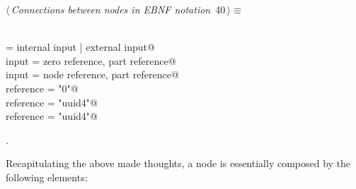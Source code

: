 \documentclass[
    a4paper,      %
    10pt,         %
    openright,    %
    notitlepage,  %
    parskip=half, %
]{scrreprt}       %
\theoremstyle{definition}                    %
\begin{document}
\begin{flushleft} \small
\begin{minipage}{\linewidth}\label{scrap48}\raggedright\small
{} $\langle\,${\itshape Connections between nodes in EBNF notation}\nobreak\ {\footnotesize {40}}$\,\rangle\equiv$
\vspace{-1ex}
\begin{list}{}{} \item
\mbox{}\lstinline@@\\
\mbox{}\lstinline@input = internal input | external input@\\
\mbox{}\lstinline@internal input = zero reference, part reference@\\
\mbox{}\lstinline@external input = node reference, part reference@\\
\mbox{}\lstinline@zero reference = "0"@\\
\mbox{}\lstinline@node reference = "uuid4"@\\
\mbox{}\lstinline@part reference = "uuid4"@\\
\mbox{}\lstinline@@{\NWsep}
\end{list}
\vspace{-1.5ex}
\footnotesize
\begin{list}{}{\setlength{\itemsep}{-\parsep}\setlength{\itemindent}{-\leftmargin}}
\item {\NWtxtMacroNoRef}.

\item{}
\end{list}
\end{minipage}\vspace{4ex}
\end{flushleft}
%

Recapitulating the above made thoughts, a node is essentially composed by the
following elements:
\end{document}
